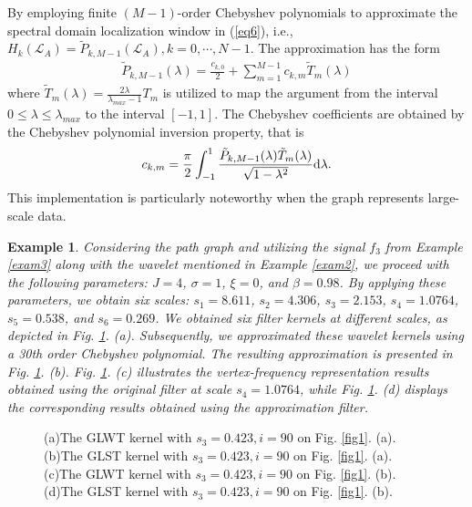 \documentclass[lettersize,journal]{IEEEtran}
\newtheorem{example}{Example}
\begin{document}
By employing finite $(M-1)$-order Chebyshev polynomials to approximate the spectral domain localization window in (\ref{eq6}), i.e., $H_k(\mathcal{L}_{A}) =\tilde{P}_{k,M-1}(\mathcal{L}_{A}), k=0,\cdots,N-1$. The approximation has the form
\begin{align}
	\tilde{P}_{k,M-1}(\lambda)=\frac{c_{k,0}}{2}+\sum_{m=1}^{M-1}c_{k,m}\tilde{T}_m(\lambda)
\end{align}
where $\tilde{T}_m(\lambda) = \frac{2\lambda}{\lambda_{max}-1}T_m$ is utilized to map the argument from the interval $0 \leq \lambda \leq \lambda_{max}$ to the interval $[-1,1]$.
The Chebyshev coefficients are obtained by the Chebyshev polynomial inversion property, that is
\begin{align} \label{eq17}
	c_{k,m}=\frac{\pi}{2} \int_{-1}^{1} \frac{\tilde{P}_{k,M-1}(\lambda) \tilde{T}_m(\lambda)}{\sqrt{1-\lambda^2}} {\rm d}\lambda.
\end{align}
This implementation is particularly noteworthy when the graph represents large-scale data.

\begin{example} 
	Considering the path graph and utilizing the signal $f_3$ from Example \ref{exam3} along with the wavelet mentioned in Example \ref{exam2}, we proceed with the following parameters: $J=4$, $\sigma=1$, $\xi=0$, and $\beta=0.98$. By applying these parameters, we obtain six scales: $s_1=8.611$, $s_2=4.306$, $s_3=2.153$, $s_4=1.0764$, $s_5=0.538$, and $s_6=0.269$. 
	We obtained six filter kernels at different scales, as depicted in Fig. \ref{fig8}. (a). Subsequently, we approximated these wavelet kernels using a 30th order Chebyshev polynomial. The resulting approximation is presented in Fig. \ref{fig8}. (b). 
	Fig. \ref{fig8}. (c) illustrates the vertex-frequency representation results obtained using the original filter at scale $s_4=1.0764$, while Fig. \ref{fig8}. (d) displays the corresponding results obtained using the approximation filter.
\end{example}

\begin{figure}
	\centering
	\quad
	\caption{(a)The GLWT kernel with $s_3=0.423, i=90$ on Fig. \ref{fig1}. (a). (b)The GLST kernel with $s_3=0.423, i=90$ on Fig. \ref{fig1}. (a). (c)The GLWT kernel with $s_3=0.423, i=90$ on Fig. \ref{fig1}. (b). (d)The GLST kernel with $s_3=0.423, i=90$ on Fig. \ref{fig1}. (b). }\label{fig8}
\end{figure}
\end{document}
